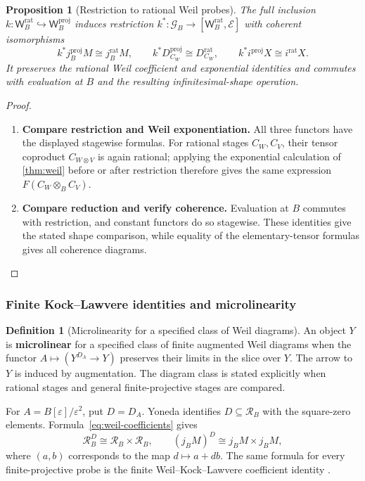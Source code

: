 \documentclass[11pt,a4paper]{article}
\numberwithin{algorithm}{section}
\numberwithin{equation}{section}
\newtheorem{proposition}[proposition]{Proposition}
\theoremstyle{definition}
\newtheorem{definition}[definition]{Definition}
\theoremstyle{remark}
\theoremstyle{plain}
\newcommand{\E}{\mathcal E}
\newcommand{\eps}{\varepsilon}
\newcommand{\Weil}{\mathsf W}
\newcommand{\Geo}{\mathcal G_B}
\newcommand{\Rline}{\mathcal R_B}
\theoremstyle{definition}
\theoremstyle{plain}
\begin{document}
\begin{proposition}[Restriction to rational Weil probes]
\label{prop:rational-restriction}
The full inclusion
$k:\Weil_B^{\mathrm{rat}}\hookrightarrow\Weil_B^{\mathrm{proj}}$
induces restriction
$k^*:\Geo\to[\Weil_B^{\mathrm{rat}},\E]$ with coherent
isomorphisms
\[
 k^*j_B^{\mathrm{proj}}M\cong j_B^{\mathrm{rat}}M,
 \qquad k^*D_{C_W}^{\mathrm{proj}}\cong D_{C_W}^{\mathrm{rat}},
 \qquad k^*i^{\mathrm{proj}}X\cong i^{\mathrm{rat}}X.
\]
It preserves the rational Weil coefficient and exponential
identities and commutes with evaluation at $B$ and the
resulting infinitesimal-shape operation.
\end{proposition}
\begin{proof}\leavevmode
\begin{enumerate}[leftmargin=*,align=left]
\item \textbf{Compare restriction and Weil exponentiation.}
All three functors have the displayed stagewise formulas.
For rational stages $C_W,C_V$, their tensor coproduct
$C_{W\otimes V}$ is again rational; applying the exponential
calculation of \cref{thm:weil} before or after restriction
therefore gives the same expression
$F(C_W\otimes_BC_V)$.

\item \textbf{Compare reduction and verify coherence.}
Evaluation at $B$ commutes with
restriction, and constant functors do so stagewise.
These identities give the stated shape comparison, while equality
of the elementary-tensor formulas gives all coherence diagrams.
\end{enumerate}
\end{proof}

\subsubsection{Finite Kock--Lawvere identities and microlinearity}

\begin{definition}[Microlinearity for a specified class of Weil diagrams]\label{def:microlinearity}
An object $Y$ is \textbf{microlinear} for a specified class of
finite augmented Weil diagrams when the functor
$A\mapsto(Y^{D_A}\to Y)$ preserves their limits in the slice over
$Y$. The arrow to $Y$ is induced by augmentation. The diagram class
is stated explicitly when rational stages and general finite-projective
stages are compared.
\end{definition}
For $A=B[\eps]/\eps^2$, put $D=D_A$.  Yoneda identifies
$D\subseteq\Rline$ with the square-zero elements.
Formula~\eqref{eq:weil-coefficients} gives
\[
 \Rline^D\cong\Rline\times\Rline,\qquad
 (j_BM)^D\cong j_BM\times j_BM,
\]
where $(a,b)$ corresponds to the map $d\mapsto a+db$.
The same formula for every finite-projective probe is the finite
Weil--Kock--Lawvere coefficient identity \citep{Kock}.
\end{document}
